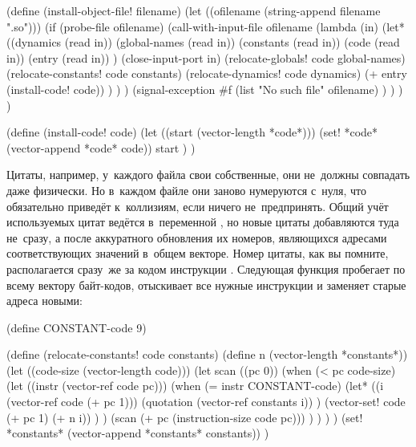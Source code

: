 
\begin{code:lisp}
(define (install-object-file! filename)
  (let ((ofilename (string-append filename ".so")))
    (if (probe-file ofilename)
        (call-with-input-file ofilename
          (lambda (in)
            (let* ((dynamics     (read in))
                   (global-names (read in))
                   (constants    (read in))
                   (code         (read in))
                   (entry        (read in)) )
              (close-input-port in)
              (relocate-globals! code global-names)
              (relocate-constants! code constants)
              (relocate-dynamics! code dynamics)
              (+ entry (install-code! code)) ) ) )
        (signal-exception #f
          (list "No such file" ofilename) ) ) ) )

(define (install-code! code)
  (let ((start (vector-length *code*)))
    (set! *code* (vector-append *code* code))
    start ) )
\end{code:lisp}


Цитаты, например, у~каждого файла свои собственные, они не~должны совпадать даже
физически. Но в~каждом файле они заново нумеруются с~нуля, что обязательно
приведёт к~коллизиям, если ничего не~предпринять. Общий учёт используемых цитат
ведётся в~переменной , но новые цитаты добавляются туда
не~сразу, а после аккуратного обновления их номеров, являющихся адресами
соответствующих значений в~общем векторе. Номер цитаты, как вы помните,
располагается сразу~же за кодом инструкции . Следующая функция
пробегает по всему вектору байт-кодов, отыскивает все нужные инструкции и
заменяет старые адреса новыми:

\begin{code:lisp}
(define CONSTANT-code 9)

(define (relocate-constants! code constants)
  (define n (vector-length *constants*))
  (let ((code-size (vector-length code)))
    (let scan ((pc 0))
      (when (< pc code-size)
        (let ((instr (vector-ref code pc)))
          (when (= instr CONSTANT-code)
            (let* ((i (vector-ref code (+ pc 1)))
                   (quotation (vector-ref constants i)) )
              (vector-set! code (+ pc 1) (+ n i)) ) )
          (scan (+ pc (instruction-size code pc))) ) ) ) )
  (set! *constants* (vector-append *constants* constants)) )
\end{code:lisp}


